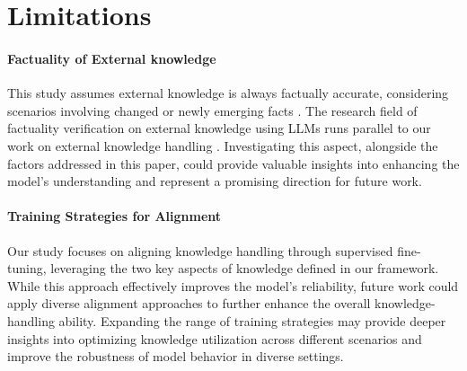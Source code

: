 \section*{Limitations}

\paragraph{Factuality of External knowledge}
This study assumes external knowledge is always factually accurate, considering scenarios involving changed or newly emerging facts \citep{longpre-etal-2021-entity, xie2023adaptive}.
The research field of factuality verification on external knowledge using LLMs runs parallel to our work on external knowledge handling \citep{yu-etal-2024-truth, fatahi-bayat-etal-2023-fleek}.
Investigating this aspect, alongside the factors addressed in this paper, could provide valuable insights into enhancing the model's understanding and represent a promising direction for future work.


\paragraph{Training Strategies for Alignment}
Our study focuses on aligning knowledge handling through supervised fine-tuning, leveraging the two key aspects of knowledge defined in our framework. 
While this approach effectively improves the model's reliability, future work could apply diverse alignment approaches \citep{rafailov2023direct, tian2024finetuning} to further enhance the overall knowledge-handling ability. 
Expanding the range of training strategies may provide deeper insights into optimizing knowledge utilization across different scenarios and improve the robustness of model behavior in diverse settings.

